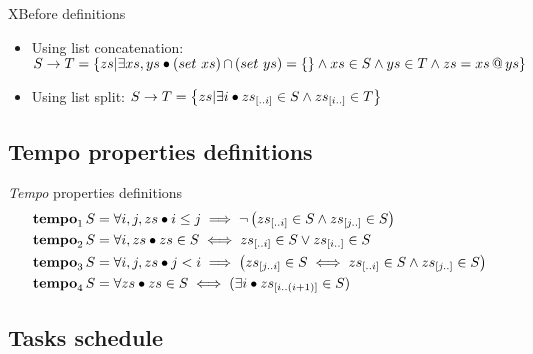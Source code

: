 \documentclass{beamer}
\makeatletter
\newcommand{\sliceright}[2]{\ensuremath #1_{\left[..#2\right]}}
\newcommand{\sliceleft}[2]{\ensuremath #1_{\left[#2..\right]}}
\newcommand{\slice}[3]{\ensuremath #1_{\left[#2..#3\right]}}
\def\xbeforeop{\ensuremath\rightarrow}
\newcommand{\xbefore}[2]{\ensuremath #1 \xbeforeop #2 }
\def\inter{\ensuremath\operatorname{\cap}}
\def\tempoop{\ensuremath\operatorname{\mathbf{tempo}}}
\newcommand{\tempo}[2][1-4]{\ensuremath\tempoop_{#1} #2}
\newcommand{\append}[2]{\ensuremath #1 \operatorname{\mathbf{@}} #2}
\makeatother
\begin{document}
\begin{frame}[noframenumbering,label=xbeforedefs]{XBefore definitions}
	\begin{itemize}
		\item Using list concatenation:
			{\scriptsize
						$\xbefore{S}{T} =
									  \left\{
									    zs | \exists xs, ys \bullet \left(set~xs\right) \inter \left(set~ys\right) = \{\}
									      \land xs \in S \land ys \in T \land zs = \append{xs}{ys}
									  \right\}$}
		\item Using list split:
			{\scriptsize
				$\xbefore{S}{T} =
									\left\{
										zs | \exists i \bullet \sliceright{zs}{i} \in S \land \sliceleft{zs}{i} \in T
									\right\}$}
	\end{itemize}
	\hyperlink{expressorder}{}
\end{frame}

\subsection{Tempo properties definitions}

\begin{frame}[noframenumbering,label=tempodetail]{\emph{Tempo} properties definitions}
	{\scriptsize\begin{align*}
			\tempo[1]{S} &= \forall i, j, zs \bullet
			  i \le j \implies
			  \lnot \left(
			    \sliceright{zs}{i} \in S \land \sliceleft{zs}{j} \in S
			  \right)\\
			\tempo[2]{S} &= \forall i, zs \bullet
			  zs \in S \iff
			  \sliceright{zs}{i} \in S \lor \sliceleft{zs}{i} \in S\\
			\tempo[3]{S} &= \forall i, j, zs \bullet
			  j < i \implies
			  \left(
			    \slice{zs}{j}{i} \in S \iff \sliceright{zs}{i} \in S \land \sliceleft{zs}{j} \in S
			  \right)\\
			\tempo[4]{S} &= \forall zs \bullet zs \in S \iff (\exists i \bullet \slice{zs}{i}{\left(i+1\right)} \in S)
		\end{align*}}
	\hyperlink{tempo}{}
\end{frame}

\subsection{Tasks schedule}
\end{document}
